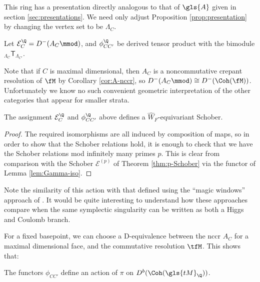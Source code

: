 This ring has a presentation directly analogous to that of $\gls{A}$ given in section \ref{sec:presentations}.  We need only adjust Proposition \ref{prop:presentation} by changing the vertex set to be $\Lambda_{C}$.  
\begin{definition}
  Let $\mathcal{E}^{\Q}_C=D^-(A_C\mmod)$, and $\phi_{CC'}^{\Q}$ be derived tensor product with the bimodule ${}_{\Lambda_{C}}\mathsf{T}_{\Lambda_{C'}}$.  
\end{definition}
Note that if $C$ is maximal dimensional, then $A_C$ is a noncommutative crepant resolution of $\fM$ by Corollary \ref{cor:A-nccr},  so $D^-(A_C\mmod)\cong D^-(\Coh(\fM))$.  Unfortunately we know no such convenient geometric interpretation of the other categories that appear for smaller strata.  
\begin{theorem}
  The assignment $\mathcal{E}^{\Q}_C$ and $\phi_{CC'}^{\Q}$ above defines a $\widehat{W}_F$-equivariant Schober.
\end{theorem}
\begin{proof}
  The required isomorphisms are all induced by composition of maps, so in order to show that the Schober relations hold, it is enough to check that we have the Schober relations mod infinitely many primes $p$.  This is clear from comparison with the Schober $\mathcal{E}^{(p)}$ of Theorem \ref{thm:p-Schober} via the functor of Lemma \ref{lem:Gamma-iso}.  
\end{proof}
Note the similarity of this action with that defined using the ``magic windows'' approach of \cite{HLSdeq}.  It would be quite interesting to understand how these approaches compare when the same symplectic singularity can be written as both a Higgs and Coulomb branch.

For a fixed basepoint, we can choose a D-equivalence between the nccr $A_C$ for a maximal dimensional face, and the commutative resolution $\tfM$.  This shows that:
\begin{corollary}
  The functors $\phi_{CC'}$ define an action of $\pi$ on $D^b(\Coh(\gls{tM}_\Q))$.   
\end{corollary}





